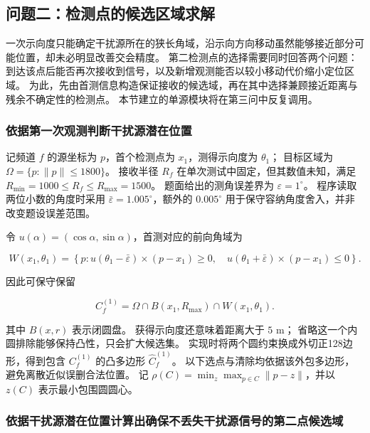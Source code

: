 \subsection{问题二：检测点的候选区域求解}\label{sec:q2}

一次示向度只能确定干扰源所在的狭长角域，沿示向方向移动虽然能够接近部分可能位置，却未必明显改善交会精度。
第二检测点的选择需要同时回答两个问题：到达该点后能否再次接收到信号，以及新增观测能否以较小移动代价缩小定位区域。
为此，先由首测信息构造保证接收的候选域，再在其中选择兼顾接近距离与残余不确定性的检测点。
本节建立的单源模块将在第三问中反复调用。

\subsubsection{依据第一次观测判断干扰源潜在位置}\label{sec:q2-1}

记频道 \(f\) 的源坐标为 \(p\)，首个检测点为 \(x_1\)，测得示向度为 \(\theta_1\)；
目标区域为 \(\Omega=\{p:\|p\|\le1800\}\)。
接收半径 \(R_f\) 在单次测试中固定，但其数值未知，满足 \(R_{\min}=1000\le R_f\le R_{\max}=1500\)。
题面给出的测角误差界为 \(\varepsilon=1^\circ\)。
程序读取两位小数的角度时采用 \(\bar\varepsilon=1.005^\circ\)，额外的 \(0.005^\circ\) 用于保守容纳角度舍入，并非改变题设误差范围。

令 \(u(\alpha)=(\cos\alpha,\sin\alpha)\)，首测对应的前向角域为

\begin{equation}\label{eq:q2-1}
W(x_1,\theta_1)=\left\{p:
u(\theta_1-\bar\varepsilon)\times(p-x_1)\ge0,\quad
u(\theta_1+\bar\varepsilon)\times(p-x_1)\le0
\right\}.
\end{equation}

因此可保守保留

\begin{equation}\label{eq:q2-2}
C_f^{(1)}=\Omega\cap B(x_1,R_{\max})\cap W(x_1,\theta_1).
\end{equation}

其中 \(B(x,r)\) 表示闭圆盘。
获得示向度还意味着距离大于 \(5\) m；
省略这一个内圆排除能够保持凸性，只会扩大候选集。
实现时将两个圆约束换成外切正128边形，得到包含 \(C_f^{(1)}\) 的凸多边形 \(\widehat C_f^{(1)}\)。
以下选点与清除均依据该外包多边形，避免离散近似误删合法位置。
记 \(\rho(C)=\min_z\max_{p\in C}\|p-z\|\)，并以 \(z(C)\) 表示最小包围圆圆心。

\subsubsection{依据干扰源潜在位置计算出确保不丢失干扰源信号的第二点候选域}\label{sec:q2-2}

